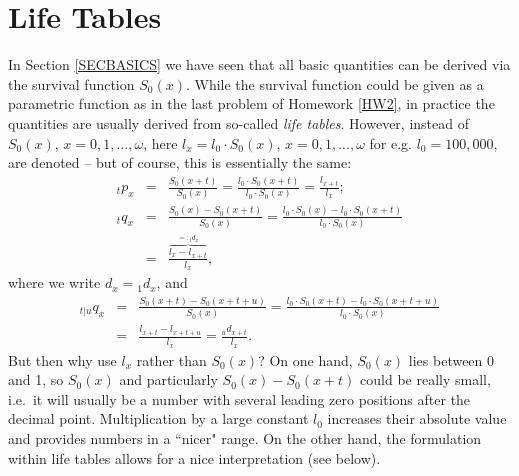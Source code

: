 \documentclass[11pt,fleqn,oneside]{book}
\begin{document}
\section{Life Tables}
\label{SECLIFETABS}

In Section \ref{SECBASICS} we have seen that all basic quantities can be derived via the survival function $S_0(x)$. While the survival function could be given as a parametric function as in the last problem of Homework \ref{HW2}, in practice the quantities are usually derived from so-called \textit{life tables}. However, instead of $S_0(x)$, $x=0,1,...,\omega$, here $l_x = l_0\cdot S_0(x)$, $x=0,1,...,\omega$ for e.g. $l_0 = 100,000$, are denoted -- but of course, this is essentially the same:
\begin{eqnarray*}
{_tp_x}   &=& \frac{S_0(x+t)}{S_0(x)} = \frac{l_0\cdot S_0(x+t)}{l_0\cdot S_0(x)} = \frac{l_{x+t}}{l_x}; \\
{_t q_x}  &=& \frac{S_0(x) - S_0(x+t)}{S_0(x)} = \frac{l_0\cdot S_0(x) - l_0 \cdot S_0(x+t)}{l_0 \cdot S_0(x)} \\
&=& \frac{\overbrace{l_x-l_{x+t}}^{=:{_td_x}}}{l_x}, 
\end{eqnarray*}
where we write $d_x = {_1d_x}$, and
\begin{eqnarray*}
{_{t|u}q_x} &=& \frac{S_0(x+t) - S_0(x+t+u)}{S_0(x)} = \frac{l_0 \cdot S_0(x+t) - l_0 \cdot S_0(x+t+u)}{
l_0 \cdot S_0(x)}\\
&=& \frac{l_{x+t} - l_{x+t+u}}{l_x} = \frac{_ud_{x+t}}{l_x}.
\end{eqnarray*}
But  then why use $l_x$ rather than $S_0(x)$? On one hand, $S_0(x)$ lies between 0 and 1, so $S_0(x)$ and particularly $S_0(x) - S_0(x+t)$ could be really small, i.e.\ it will usually be a number with several leading zero positions after the decimal point. Multiplication by a large constant $l_0$ increases their absolute value and provides numbers in a ``nicer" range. On the other hand, the formulation within life tables allows for a nice interpretation (see below).
\end{document}
